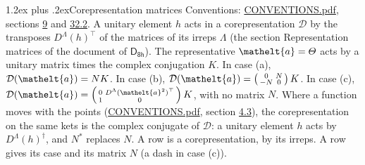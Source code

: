 \documentclass[10pt,a4paper]{article}
\makeatletter
\renewcommand\section{\@startsection{section}{1}{\z@}{-3ex plus -1ex minus -.2ex}%
  {1.2ex plus .2ex}{\normalfont\large\sffamily\bfseries\color{parttitle}}}
\numberwithin{equation}{section}
\newcommand{\eltfont}[1]{{\let\sigma\eltsigma\mathelt{#1}}}
\newcommand{\grp}[1]{\mathsf{#1}}
\newcommand{\elt}[1]{\eltfont{#1}}
\makeatother
\begin{document}
\section{Corepresentation matrices}\label{s:corep_matrices}
Conventions: \href{../../CONVENTIONS.pdf}{CONVENTIONS.pdf}, sections \href{../../../rotation/CONVENTIONS.pdf\#conv.9}{9} and \href{../../CONVENTIONS.pdf\#conv.32.2}{32.2}.
A unitary element $h$ acts in a corepresentation $\mathcal{D}$ by the transposes $D^{\Lambda}(h)^{\top}$ of the matrices of its irreps $\Lambda$ (the section Representation matrices of the document of \href{../../../rotation/data/pdf/D8h.pdf}{$\grp{D_{8h}}$}). The representative $\elt{a} = \varTheta$ acts by a unitary matrix times the complex conjugation $K$.
In case (a), $\mathcal{D}(\elt{a}) = NK$. In case (b), $\mathcal{D}(\elt{a}) = \left(\begin{smallmatrix} 0 & N \\ -N & 0 \end{smallmatrix}\right) K$. In case (c), $\mathcal{D}(\elt{a}) = \left(\begin{smallmatrix} 0 & D^{\Lambda}(\elt{a}^2)^{\top} \\ 1 & 0 \end{smallmatrix}\right) K$, with no matrix $N$.
Where a function moves with the points (\href{../../CONVENTIONS.pdf}{CONVENTIONS.pdf}, section \href{../../../rotation/CONVENTIONS.pdf\#conv.4.3}{4.3}), the corepresentation on the same kets is the complex conjugate of $\mathcal{D}$: a unitary element $h$ acts by $D^{\Lambda}(h)^{\dagger}$, and $N^{*}$ replaces $N$.
A row is a corepresentation, by its irreps. A row gives its case and its matrix $N$ (a dash in case (c)).
\end{document}
